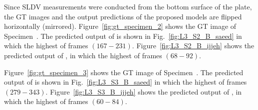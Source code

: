Since SLDV measurements were conducted from the bottom surface of the plate, the GT images and the output predictions of the proposed models are flipped horizontally (mirrored).
Figure~\ref{fig:gt_specimen_2} shows the GT image of Specimen~.
The predicted output of \DIFdelbegin {}\DIFdelend \DIFaddbegin {}\DIFaddend {} is shown in Fig.~\ref{fig:L3_S2_B_saeed} in which the highest \DIFdelbegin {}\DIFdelend \DIFaddbegin {}\DIFaddend of frames \((167-231)\).
Figure~\ref{fig:L3_S2_B_ijjeh} shows the predicted output of \DIFdelbegin {}\DIFdelend \DIFaddbegin {}\DIFaddend {}, in which the highest \DIFdelbegin {}\DIFdelend \DIFaddbegin {}\DIFaddend of frames \((68-92)\).

Figure~\ref{fig:gt_specimen_3} shows the GT image of Specimen~.
The predicted output of \DIFdelbegin {}\DIFdelend \DIFaddbegin {}\DIFaddend {} is shown in Fig.~\ref{fig:L3_S3_B_saeed} in which the highest \DIFdelbegin {}\DIFdelend \DIFaddbegin {}\DIFaddend of frames \((279-343)\).
Figure~\ref{fig:L3_S3_B_ijjeh} shows the predicted output of \DIFdelbegin {}\DIFdelend \DIFaddbegin {}\DIFaddend {}, in which the highest \DIFdelbegin {}\DIFdelend \DIFaddbegin {}\DIFaddend of frames \((60-84)\).

